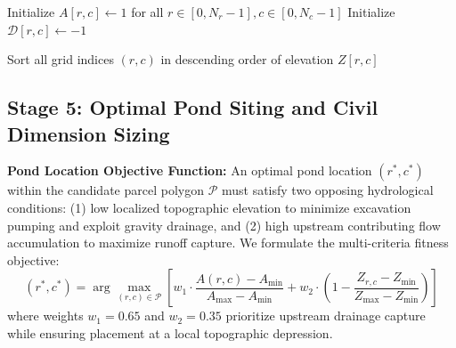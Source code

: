 \documentclass[11pt,a4paper]{article}
\begin{document}
\begin{algorithm}[H]
\small
\caption{D8 Flow Direction and Flow Accumulation Matrix Calculation}
\label{alg:d8}
Initialize $A[r, c] \gets 1$ for all $r \in [0, N_r-1], c \in [0, N_c-1]$\;
Initialize $\mathcal{D}[r, c] \gets -1$\;

Sort all grid indices $(r, c)$ in descending order of elevation $Z[r, c]$\;
\end{algorithm}

\subsection{Stage 5: Optimal Pond Siting and Civil Dimension Sizing}
\textbf{Pond Location Objective Function:} An optimal pond location $(r^*, c^*)$ within the candidate parcel polygon $\mathcal{P}$ must satisfy two opposing hydrological conditions: (1) low localized topographic elevation to minimize excavation pumping and exploit gravity drainage, and (2) high upstream contributing flow accumulation to maximize runoff capture. We formulate the multi-criteria fitness objective:
\begin{equation}
(r^*, c^*) = \arg\max_{(r, c) \in \mathcal{P}} \left[ w_1 \cdot \frac{A(r, c) - A_{\min}}{A_{\max} - A_{\min}} + w_2 \cdot \left(1 - \frac{Z_{r, c} - Z_{\min}}{Z_{\max} - Z_{\min}}\right) \right]
\label{eq:objective}
\end{equation}
where weights $w_1 = 0.65$ and $w_2 = 0.35$ prioritize upstream drainage capture while ensuring placement at a local topographic depression.
\end{document}
